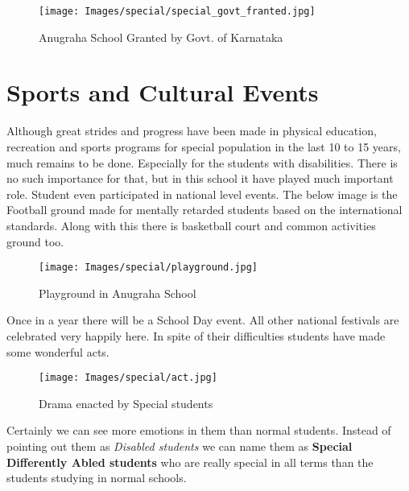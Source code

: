 \begin{figure}[H]
    \centering
    \texttt{[image: Images/special/special\_govt\_franted.jpg]}
    \caption*{Anugraha School Granted by Govt. of Karnataka}
\end{figure}

\section{Sports and Cultural Events}
Although great strides and progress have been made in physical education, recreation and sports programs for special population in the last 10 to 15 years, much remains to be done. Especially for the students with disabilities. There is no such importance for that, but in this school it have played much important role. Student even participated in national level events. The below image is the Football ground made for mentally retarded students based on the international standards. Along with this there is basketball court and common activities ground too. 

\begin{figure}[H]
    \centering
    \texttt{[image: Images/special/playground.jpg]}
    \caption*{Playground in Anugraha School}
\end{figure}

Once in a year there will be a School Day event. All other national festivals are celebrated very happily here. In spite of their difficulties students have made some wonderful acts. 

\begin{figure}[H]
    \centering
    \texttt{[image: Images/special/act.jpg]}
    \caption*{Drama enacted by Special students}
\end{figure}

Certainly we can see more emotions in them than normal students. Instead of pointing out them as \textit{Disabled students} we can name them as \textbf{Special Differently Abled students} who are really special in all terms than the students studying in normal schools.
\cleardoublepage